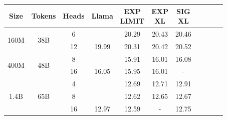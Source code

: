 \begin{tabular}{ccc|cccccccc}
    \toprule
    Size                  & Tokens               & Heads & Llama & \thead{EXP                 \\ LIMIT} & \thead{EXP \\ XL} & \thead{SIG \\ XL} \\
    \midrule
    \multirow{2}{*}{160M} & \multirow{2}{*}{38B} & 6     &       & 20.29      & 20.43 & 20.46 \\
                          &                      & 12    & 19.99    & 20.31      & 20.42 & 20.52 \\
    \midrule
    \multirow{2}{*}{400M} & \multirow{2}{*}{48B} & 8     &       & 15.91      & 16.01 & 16.08 \\
                          &                      & 16    & 16.05    & 15.95      & 16.01 & -     \\
    \midrule
    \multirow{3}{*}{1.4B} & \multirow{3}{*}{65B} & 4     &       & 12.69      & 12.71 & 12.91 \\
                          &                      & 8     &       & 12.62      & 12.65 & 12.67 \\
                          &                      & 16    & 12.97    & 12.59      & -     & 12.75 \\
    \bottomrule
\end{tabular}

